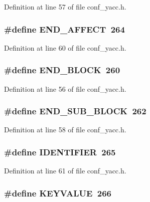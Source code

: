 Definition at line 57 of file conf\_\-yacc.h.
\subsubsection[{END\_\-AFFECT}]{\setlength{\rightskip}{0pt plus 5cm}\#define END\_\-AFFECT~264}\label{conf__yacc_8h_118bfcf86c66a3e14247675e6eb0e336}




Definition at line 60 of file conf\_\-yacc.h.
\subsubsection[{END\_\-BLOCK}]{\setlength{\rightskip}{0pt plus 5cm}\#define END\_\-BLOCK~260}\label{conf__yacc_8h_1e33ae802796dae8694948b87ac62d61}




Definition at line 56 of file conf\_\-yacc.h.
\subsubsection[{END\_\-SUB\_\-BLOCK}]{\setlength{\rightskip}{0pt plus 5cm}\#define END\_\-SUB\_\-BLOCK~262}\label{conf__yacc_8h_73651ad88c3904ffeed68fc6d15c88ff}




Definition at line 58 of file conf\_\-yacc.h.
\subsubsection[{IDENTIFIER}]{\setlength{\rightskip}{0pt plus 5cm}\#define IDENTIFIER~265}\label{conf__yacc_8h_45734d64ac1283048289925ad7b30dfe}




Definition at line 61 of file conf\_\-yacc.h.
\subsubsection[{KEYVALUE}]{\setlength{\rightskip}{0pt plus 5cm}\#define KEYVALUE~266}\label{conf__yacc_8h_15956324a82088a2f23c936061145a97}




